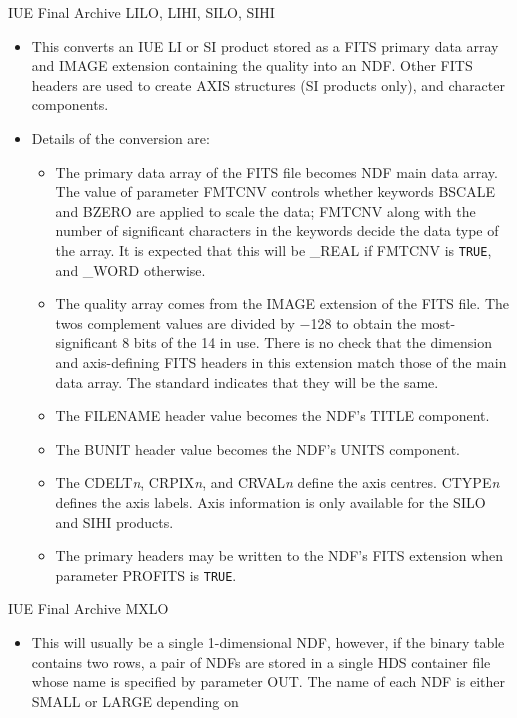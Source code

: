 \documentclass[twoside,11pt]{article}
\newcommand{\htmladdnormallink}[2]{#1}
\newcommand{\ssthitemlist}[1]{
  \latexonly{
  \mbox{} \\
  \vspace{-3.5ex}
  }
  \begin{itemize}
     #1
  \end{itemize}
}
\newcommand{\sstitem}{\item}
\newcommand{\sstitem}{\item}
\begin{document}
{{{         \bigskip
         \sstitem
         \htmladdnormallink{IUE Final Archive}{http://www.vilspa.esa.es/iue/iuefa.html}
         LILO, LIHI, SILO, SIHI
         \ssthitemlist{
            \sstitem
            This converts an IUE LI or SI product stored as a FITS primary
            data array and IMAGE extension containing the quality into an
            NDF.  Other FITS headers are used to create AXIS structures (SI
            products only), and character components.
            \sstitem
            Details of the conversion are:
            \ssthitemlist{
               \sstitem
               The primary data array of the FITS file becomes NDF main
               data array.  The value of parameter FMTCNV controls whether
               keywords BSCALE and BZERO are applied to scale the data;
               FMTCNV along with the number of significant characters in the
               keywords decide the data type of the array.  It is expected
               that this will be \_REAL if FMTCNV is \texttt{TRUE}, and \_WORD
               otherwise.
               \sstitem
               The quality array comes from the IMAGE extension of the
               FITS file.  The twos complement values are divided by $-$128 to
               obtain the most-significant 8 bits of the 14 in use.  There is
               no check that the dimension and axis-defining FITS headers in
               this extension match those of the main data array.  The
               standard indicates that they will be the same.
               \sstitem
               The FILENAME header value becomes the NDF's TITLE component.
               \sstitem
               The BUNIT header value becomes the NDF's UNITS component.
               \sstitem
               The CDELT\textit{n}, CRPIX\textit{n}, and CRVAL\textit{n} 
               define the axis centres.
               CTYPE\textit{n} defines the axis labels.  
               Axis information is only available for the SILO and SIHI 
               products.
               \sstitem
               The primary headers may be written to the NDF's FITS
               extension when parameter PROFITS is \texttt{TRUE}.
            }
         }
         \bigskip
         \pagebreak[2]
         \sstitem
         IUE Final Archive MXLO
         \ssthitemlist{
            \sstitem
            This will usually be a single 1-dimensional NDF, however, if
            the binary table contains two rows, a pair of NDFs are stored in
            a single HDS container file whose name is specified by parameter
            OUT.  The name of each NDF is either SMALL or LARGE depending on
}}}}
\end{document}
